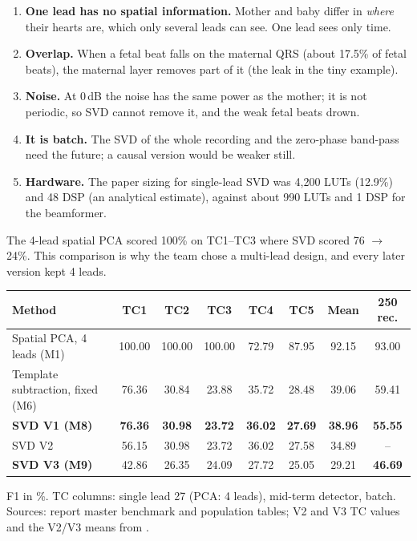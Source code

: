 \documentclass[11pt]{article}
\renewcommand{\file}[1]{\path{#1}}
\begin{document}
\begin{lesson}
\begin{enumerate}
  \item \textbf{One lead has no spatial information.} Mother and baby differ in \emph{where} their hearts are, which only several leads can see. One lead sees only time.
  \item \textbf{Overlap.} When a fetal beat falls on the maternal QRS (about 17.5\% of fetal beats), the maternal layer removes part of it (the leak in the tiny example).
  \item \textbf{Noise.} At 0\,dB the noise has the same power as the mother; it is not periodic, so SVD cannot remove it, and the weak fetal beats drown.
  \item \textbf{It is batch.} The SVD of the whole recording and the zero-phase band-pass need the future; a causal version would be weaker still.
  \item \textbf{Hardware.} The paper sizing for single-lead SVD was 4,200 LUTs (12.9\%) and 48 DSP (an analytical estimate), against about 990 LUTs and 1 DSP for the beamformer.
\end{enumerate}
The 4-lead spatial PCA scored 100\% on TC1--TC3 where SVD scored 76 $\to$ 24\%. This comparison is why the team chose a multi-lead design, and every later version kept 4 leads.
\end{lesson}

\begin{center}
\small
\begin{tabular}{@{}lccccccc@{}}
\toprule
\textbf{Method} & \textbf{TC1} & \textbf{TC2} & \textbf{TC3} & \textbf{TC4} & \textbf{TC5} & \textbf{Mean} & \textbf{250 rec.} \\
\midrule
Spatial PCA, 4 leads (M1) & 100.00 & 100.00 & 100.00 & 72.79 & 87.95 & 92.15 & 93.00 \\
Template subtraction, fixed (M6) & 76.36 & 30.84 & 23.88 & 35.72 & 28.48 & 39.06 & 59.41 \\
\textbf{SVD V1 (M8)} & \textbf{76.36} & \textbf{30.98} & \textbf{23.72} & \textbf{36.02} & \textbf{27.69} & \textbf{38.96} & \textbf{55.55} \\
SVD V2 & 56.15 & 30.98 & 23.72 & 36.02 & 27.58 & 34.89 & -- \\
\textbf{SVD V3 (M9)} & 42.86 & 26.35 & 24.09 & 27.72 & 25.05 & 29.21 & \textbf{46.69} \\
\bottomrule
\end{tabular}

{\footnotesize F1 in \%. TC columns: single lead 27 (PCA: 4 leads), mid-term detector, batch. Sources: report master benchmark and population tables; V2 and V3 TC values and the V2/V3 means from \file{code/results/metrics.csv}.}
\end{center}
\end{document}
